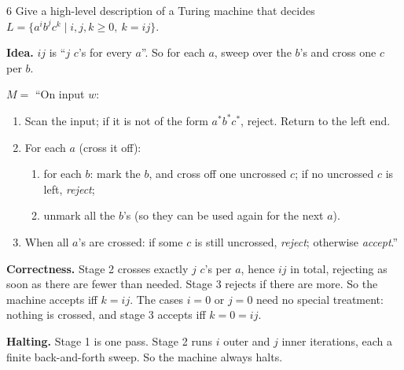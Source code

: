 \begin{question}{6}
Give a high-level description of a Turing machine that decides $L=\{a^ib^jc^k\mid i,j,k\ge 0,\ k=ij\}$.
\end{question}
\begin{soln}
\textbf{Idea.} $ij$ is ``$j$ $c$'s for every $a$''. So for each $a$, sweep over the $b$'s and cross one $c$ per $b$.

$M=$ ``On input $w$:
\begin{enumerate}
\item Scan the input; if it is not of the form $a^*b^*c^*$, reject. Return to the left end.
\item For each $a$ (cross it off):
  \begin{enumerate}
  \item for each $b$: mark the $b$, and cross off one uncrossed $c$; if no uncrossed $c$ is left, \emph{reject};
  \item unmark all the $b$'s (so they can be used again for the next $a$).
  \end{enumerate}
\item When all $a$'s are crossed: if some $c$ is still uncrossed, \emph{reject}; otherwise \emph{accept}.''
\end{enumerate}

\textbf{Correctness.} Stage 2 crosses exactly $j$ $c$'s per $a$, hence $ij$ in total, rejecting as soon as there are fewer than needed. Stage 3 rejects if there are more. So the machine accepts iff $k=ij$. The cases $i=0$ or $j=0$ need no special treatment: nothing is crossed, and stage 3 accepts iff $k=0=ij$.

\textbf{Halting.} Stage 1 is one pass. Stage 2 runs $i$ outer and $j$ inner iterations, each a finite back-and-forth sweep. So the machine always halts.
\end{soln}

